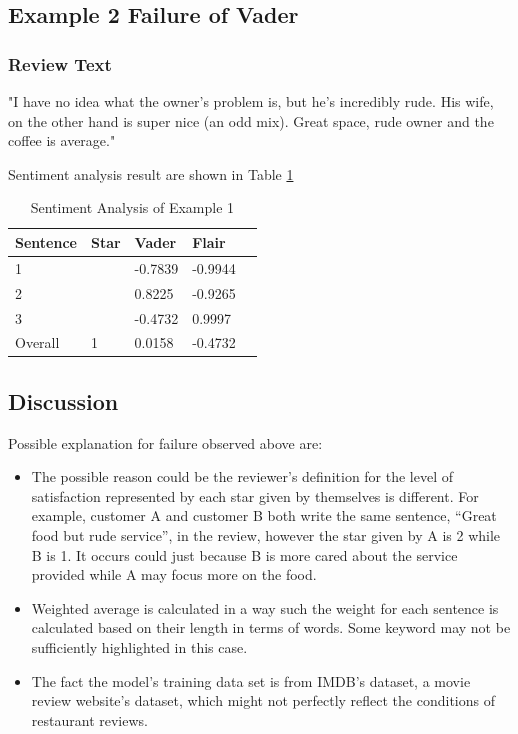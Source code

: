 \documentclass[sigconf]{acmart}
\begin{document}
\subsection{Example 2 Failure of Vader}

\subsubsection{Review Text}"I have no idea what the owner's problem is, but he's incredibly rude. His wife, on the other hand is super nice (an odd mix). Great space, rude owner and the coffee is average."

Sentiment analysis result are shown in Table \ref{tab:eg2}
\begin{table}
  \caption{Sentiment Analysis of Example 1}
  \label{tab:eg2}
  \begin{tabular}{lllll}
    \toprule
    Sentence & Star & Vader & Flair \\
    \midrule
    1 & & -0.7839 & -0.9944\\
    2 & & 0.8225 & -0.9265\\
    3 & & -0.4732 & 0.9997\\
    \bottomrule
    Overall & 1 & 0.0158 & -0.4732\\
\end{tabular}
\end{table}

\subsection{Discussion} Possible explanation for failure observed above are:
\begin{itemize}
\item The possible reason could be the reviewer’s definition for the level of satisfaction represented by each star given by themselves is different. For example, customer A and customer B both write the same sentence, “Great food but rude service”, in the review, however the star given by A is 2 while B is 1. It occurs could just because B is more cared about the service provided while A may focus more on the food.
\item Weighted average is calculated in a way such the weight for each sentence is calculated based on their length in terms of words. Some keyword may not be sufficiently highlighted in this case.
\item The fact the model’s training data set is from IMDB’s dataset, a movie review website’s dataset, which might not perfectly reflect the conditions of restaurant reviews.
\end{itemize}
\end{document}
